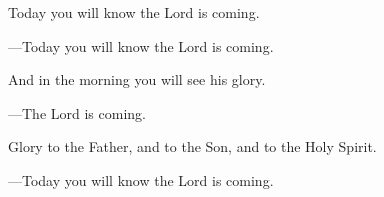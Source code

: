 \responsory

\begin{hangpar}
Today you will know the Lord is coming.

{\color{red}---\thinspace }Today you will know the Lord is coming.

\medskip And in the morning you will see his glory.

{\color{red}---\thinspace }The Lord is coming.

\medskip Glory to the Father, and to the Son, and to the Holy Spirit.

{\color{red}---\thinspace }Today you will know the Lord is coming.
\end{hangpar}
